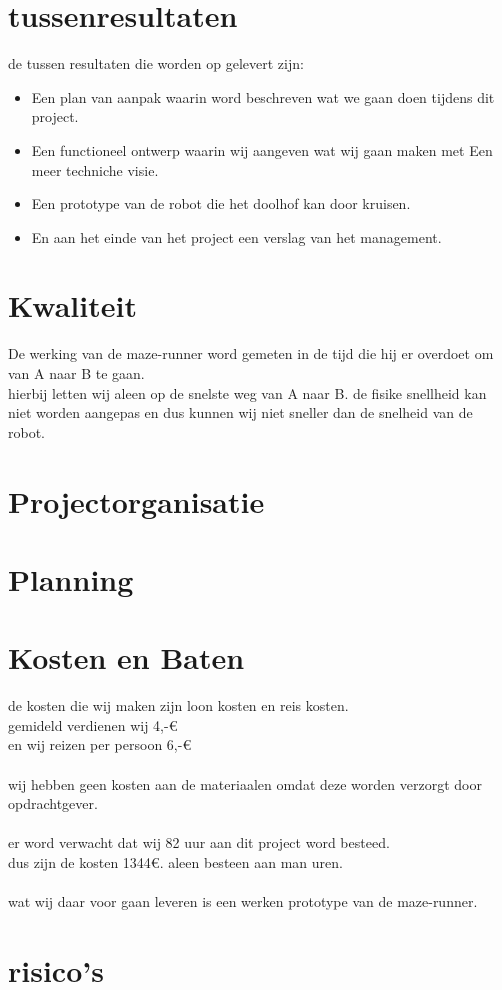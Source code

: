 \documentclass[oneside]{book}
\begin{document}
\chapter{tussenresultaten}
	de tussen resultaten die worden op gelevert zijn:
\begin{itemize}
	\item Een plan van aanpak waarin word beschreven wat we gaan doen tijdens dit project.
	\item Een functioneel ontwerp waarin wij aangeven wat wij gaan maken met Een meer techniche visie.
	\item Een prototype van de robot die het doolhof kan door kruisen.
	\item En aan het einde van het project een verslag van het management.
\end{itemize}
\clearpage
\chapter{Kwaliteit}
	De werking van de maze-runner word gemeten in de tijd die hij er overdoet om van A naar B te gaan.\\
	hierbij letten wij aleen op de snelste weg van A naar B. de fisike snellheid kan niet worden aangepas en dus kunnen wij niet sneller dan de snelheid van de robot.
\clearpage
\chapter{Projectorganisatie}

\clearpage
\chapter{Planning}
\begin{table}

\end{table}
\clearpage
\chapter{Kosten en Baten}
de kosten die wij maken zijn loon kosten en reis kosten.\\
gemideld verdienen wij 4,-\euro{} \\
en wij reizen per persoon 6,-\euro{} \\ 
\\
wij hebben geen kosten aan de materiaalen omdat deze worden verzorgt door opdrachtgever.\\
\\
er word verwacht dat wij 82 uur aan dit project word besteed.\\
dus zijn de kosten 1344\euro{}. aleen besteen aan man uren.\\
\\
wat wij daar voor gaan leveren is een werken prototype van de maze-runner.
\clearpage
\chapter{risico's}

\clearpage
\end{document}
